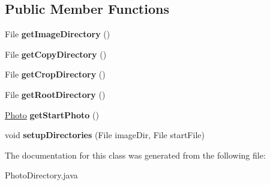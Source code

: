 \subsection*{Public Member Functions}
\begin{DoxyCompactItemize}
\item 
\hypertarget{class_photo_directory_a9747fd41e2b47ec2af2a1335abb22255}{File {\bfseries get\-Image\-Directory} ()}\label{class_photo_directory_a9747fd41e2b47ec2af2a1335abb22255}

\item 
\hypertarget{class_photo_directory_a52c74f7d9f5ad19f8e8ec4f87339cdff}{File {\bfseries get\-Copy\-Directory} ()}\label{class_photo_directory_a52c74f7d9f5ad19f8e8ec4f87339cdff}

\item 
\hypertarget{class_photo_directory_a529f7fe8c7f74db920c783a07f427eb9}{File {\bfseries get\-Crop\-Directory} ()}\label{class_photo_directory_a529f7fe8c7f74db920c783a07f427eb9}

\item 
\hypertarget{class_photo_directory_a63de251b82177b9f68b9804ae548569d}{File {\bfseries get\-Root\-Directory} ()}\label{class_photo_directory_a63de251b82177b9f68b9804ae548569d}

\item 
\hypertarget{class_photo_directory_a6f069dd0739960d9654a80fd977ddbfd}{\hyperlink{class_photo}{Photo} {\bfseries get\-Start\-Photo} ()}\label{class_photo_directory_a6f069dd0739960d9654a80fd977ddbfd}

\item 
\hypertarget{class_photo_directory_aeed775d22ac8ef9319ff97b8212b78bf}{void {\bfseries setup\-Directories} (File image\-Dir, File start\-File)}\label{class_photo_directory_aeed775d22ac8ef9319ff97b8212b78bf}

\end{DoxyCompactItemize}


The documentation for this class was generated from the following file\-:\begin{DoxyCompactItemize}
\item 
Photo\-Directory.\-java\end{DoxyCompactItemize}
